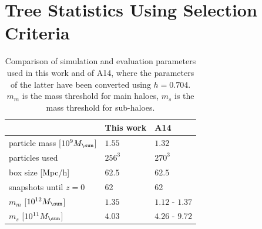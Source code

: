\section{Tree Statistics Using \citet{SUSSING_HALOFINDER} Selection Criteria}\label{app:performance_comparison}



\begin{table}
\centering
\caption{
	Comparison of simulation and evaluation parameters used in this work and of A14, where the parameters of the latter have been converted using $h = 0.704$.
	$m_m$ is the mass threshold for main haloes, $m_s$ is the mass threshold for sub-haloes.
	\label{tab:parameter-comparison}
}
	\begin{tabular}[c]{l l l}
																	&	This work		&	A14 \\
		\hline
		particle mass	[$10^9 \msol$]	&	$1.55$			& $1.32$						\\
		particles used								& $256^3$			& $270^3$ 					\\
		box size [Mpc/h]							& $62.5$			& $62.5$						\\
		snapshots until $z = 0$				& 62					& 62								\\				
		$m_m$ [$10^{12} \msol$]				&	$1.35$			& $1.12$ - $1.37$		\\
		$m_s$ [$10^{11} \msol$]				&	$4.03$			& $4.26$ - $9.72$		\\
		\hline
	\end{tabular}
\end{table}



